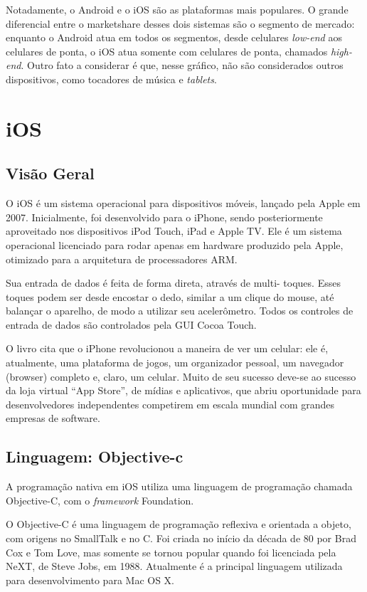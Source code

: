  Notadamente, o Android e o iOS são as plataformas mais populares. O grande diferencial entre o marketshare desses dois sistemas são o segmento de mercado: enquanto o Android atua em todos os segmentos, desde celulares \emph{low-end} aos celulares de ponta, o iOS atua somente com celulares de ponta, chamados \emph{high-end}. Outro fato a considerar é que, nesse gráfico, não são considerados outros dispositivos, como tocadores de música e \emph{tablets}.

 \section{iOS}
 \subsection{Visão Geral}

 O iOS é um sistema operacional para dispositivos móveis, lançado pela Apple em 2007. Inicialmente, foi desenvolvido para o iPhone, sendo posteriormente aproveitado nos dispositivos iPod Touch, iPad e Apple TV. Ele é um sistema operacional licenciado para rodar apenas em hardware produzido pela Apple, otimizado para a arquitetura de processadores ARM.
 
 Sua entrada de dados é feita de forma direta, através de multi- toques. Esses toques podem ser desde encostar o dedo, similar a um clique do mouse, até balançar o aparelho, de modo a utilizar seu acelerômetro. Todos os controles de entrada de dados são controlados pela \ac{GUI} Cocoa Touch.
 
 O livro \cite{usecabecaiphone} cita que o iPhone revolucionou a maneira de ver um celular: ele é, atualmente, uma plataforma de jogos, um organizador pessoal, um navegador (browser) completo e, claro, um celular. Muito de seu sucesso deve-se ao sucesso da loja virtual ``App Store'', de mídias e aplicativos, que abriu oportunidade para desenvolvedores independentes competirem em escala mundial com grandes empresas de software. 

 \subsection{Linguagem: Objective-c}
 A programação nativa em iOS utiliza uma linguagem de programação chamada Objective-C, com o \emph{framework} Foundation. 
 
 O Objective-C é uma linguagem de programação reflexiva e orientada a objeto, com origens no SmallTalk e no C. Foi criada no início da década de 80 por Brad Cox e Tom Love, mas somente se tornou popular quando foi licenciada pela NeXT, de Steve Jobs, em 1988. Atualmente é a principal linguagem utilizada para desenvolvimento para Mac OS X.
 
